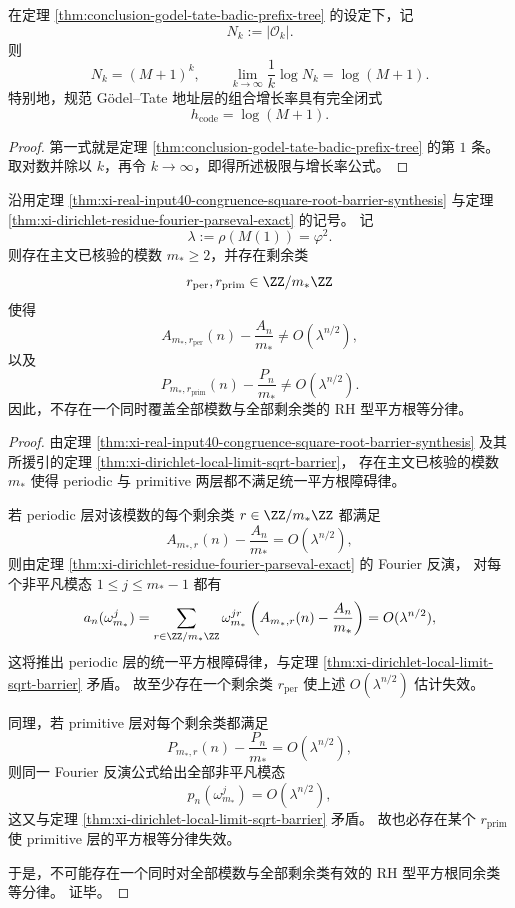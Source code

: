 \begin{corollary}[规范编码层的精确增长熵]\label{cor:conclusion-godel-tate-prefix-entropy}
在定理 \ref{thm:conclusion-godel-tate-badic-prefix-tree} 的设定下，记
\[
N_k:=|\mathcal O_k|.
\]
则
\[
N_k=(M+1)^k,
\qquad
\lim_{k\to\infty}\frac{1}{k}\log N_k=\log(M+1).
\]
特别地，规范 Gödel--Tate 地址层的组合增长率具有完全闭式
\[
h_{\mathrm{code}}=\log(M+1).
\]
\end{corollary}
\begin{proof}
第一式就是定理 \ref{thm:conclusion-godel-tate-badic-prefix-tree} 的第 \(1\) 条。
取对数并除以 \(k\)，再令 \(k\to\infty\)，即得所述极限与增长率公式。
\end{proof}

\begin{theorem}\label{thm:conclusion-realinput40-no-uniform-rh-residue-law}
沿用定理 \ref{thm:xi-real-input40-congruence-square-root-barrier-synthesis}
与定理 \ref{thm:xi-dirichlet-residue-fourier-parseval-exact} 的记号。
记
\[
\lambda:=\rho(M(1))=\varphi^2.
\]
则存在主文已核验的模数 \(m_\ast\ge 2\)，并存在剩余类
\[
r_{\mathrm{per}},r_{\mathrm{prim}}\in \ZZ/m_\ast\ZZ
\]
使得
\[
A_{m_\ast,r_{\mathrm{per}}}(n)-\frac{A_n}{m_\ast}\neq O(\lambda^{n/2}),
\]
以及
\[
P_{m_\ast,r_{\mathrm{prim}}}(n)-\frac{P_n}{m_\ast}\neq O(\lambda^{n/2}).
\]
因此，不存在一个同时覆盖全部模数与全部剩余类的 RH 型平方根等分律。
\end{theorem}
\begin{proof}
由定理 \ref{thm:xi-real-input40-congruence-square-root-barrier-synthesis}
及其所援引的定理 \ref{thm:xi-dirichlet-local-limit-sqrt-barrier}，
存在主文已核验的模数 \(m_\ast\) 使得 periodic 与 primitive 两层都不满足统一平方根障碍律。

若 periodic 层对该模数的每个剩余类 \(r\in \ZZ/m_\ast\ZZ\) 都满足
\[
A_{m_\ast,r}(n)-\frac{A_n}{m_\ast}=O(\lambda^{n/2}),
\]
则由定理 \ref{thm:xi-dirichlet-residue-fourier-parseval-exact} 的 Fourier 反演，
对每个非平凡模态 \(1\le j\le m_\ast-1\) 都有
\[
a_n(\omega_{m_\ast}^j)
=
\sum_{r\in \ZZ/m_\ast\ZZ}
\omega_{m_\ast}^{jr}
\left(
A_{m_\ast,r}(n)-\frac{A_n}{m_\ast}
\right)
=
O(\lambda^{n/2}),
\]
这将推出 periodic 层的统一平方根障碍律，与定理
\ref{thm:xi-dirichlet-local-limit-sqrt-barrier}
矛盾。
故至少存在一个剩余类 \(r_{\mathrm{per}}\) 使上述 \(O(\lambda^{n/2})\) 估计失效。

同理，若 primitive 层对每个剩余类都满足
\[
P_{m_\ast,r}(n)-\frac{P_n}{m_\ast}=O(\lambda^{n/2}),
\]
则同一 Fourier 反演公式给出全部非平凡模态
\[
p_n(\omega_{m_\ast}^j)=O(\lambda^{n/2}),
\]
这又与定理
\ref{thm:xi-dirichlet-local-limit-sqrt-barrier}
矛盾。
故也必存在某个 \(r_{\mathrm{prim}}\) 使 primitive 层的平方根等分律失效。

于是，不可能存在一个同时对全部模数与全部剩余类有效的 RH 型平方根同余类等分律。
证毕。
\end{proof}

